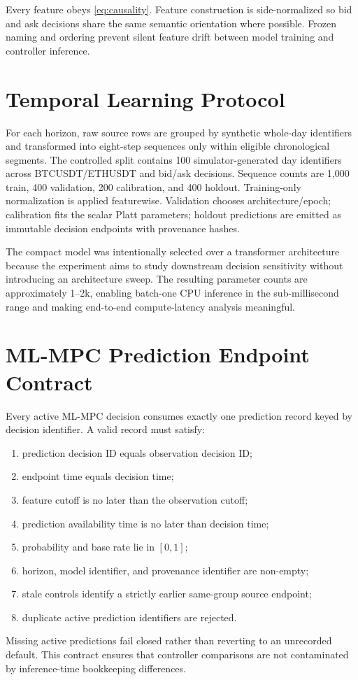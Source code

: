 \documentclass[journal,10pt]{IEEEtran}
\newcommand{\1}{\mathbf{1}}
\begin{document}
Every feature obeys \cref{eq:causality}. Feature construction is side-normalized so bid and ask decisions share the same semantic orientation where possible. Frozen naming and ordering prevent silent feature drift between model training and controller inference.

\section{Temporal Learning Protocol}
For each horizon, raw source rows are grouped by synthetic whole-day identifiers and transformed into eight-step sequences only within eligible chronological segments. The controlled split contains 100 simulator-generated day identifiers across BTCUSDT/ETHUSDT and bid/ask decisions. Sequence counts are 1,000 train, 400 validation, 200 calibration, and 400 holdout. Training-only normalization is applied featurewise. Validation chooses architecture/epoch; calibration fits the scalar Platt parameters; holdout predictions are emitted as immutable decision endpoints with provenance hashes.

The compact model was intentionally selected over a transformer architecture because the experiment aims to study downstream decision sensitivity without introducing an architecture sweep. The resulting parameter counts are approximately 1--2k, enabling batch-one CPU inference in the sub-millisecond range and making end-to-end compute-latency analysis meaningful.

\section{ML-MPC Prediction Endpoint Contract}
Every active ML-MPC decision consumes exactly one prediction record keyed by decision identifier. A valid record must satisfy:
\begin{enumerate}[leftmargin=*]
    \item prediction decision ID equals observation decision ID;
    \item endpoint time equals decision time;
    \item feature cutoff is no later than the observation cutoff;
    \item prediction availability time is no later than decision time;
    \item probability and base rate lie in $[0,1]$;
    \item horizon, model identifier, and provenance identifier are non-empty;
    \item stale controls identify a strictly earlier same-group source endpoint;
    \item duplicate active prediction identifiers are rejected.
\end{enumerate}
Missing active predictions fail closed rather than reverting to an unrecorded default. This contract ensures that controller comparisons are not contaminated by inference-time bookkeeping differences.
\end{document}
